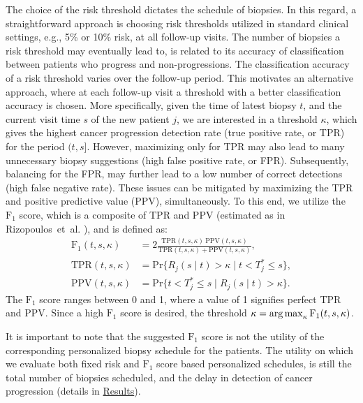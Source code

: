 The choice of the risk threshold dictates the schedule of biopsies. In this regard, a straightforward approach is choosing risk thresholds utilized in standard clinical settings, e.g., 5\% or 10\% risk, at all follow-up visits. The number of biopsies a risk threshold may eventually lead to, is related to its accuracy of classification between patients who progress and non-progressions. The classification accuracy of a risk threshold varies over the follow-up period. This motivates an alternative approach, where at each follow-up visit a threshold with a better classification accuracy is chosen. More specifically, given the time of latest biopsy $t$, and the current visit time $s$ of the new patient $j$, we are interested in a threshold $\kappa$, which gives the highest cancer progression detection rate (true positive rate, or TPR) for the period $(t, s]$. However, maximizing only for TPR may also lead to many unnecessary biopsy suggestions (high false positive rate, or FPR). Subsequently, balancing for the FPR, may further lead to a low number of correct detections (high false negative rate). These issues can be mitigated by maximizing the TPR and positive predictive value (PPV), simultaneously. To this end, we utilize the $\mbox{F}_1$ score, which is a composite of TPR and PPV (estimated as in Rizopoulos~et~al. \cite{landmarking2017}), and is defined as:
\begin{equation}
\label{eq:F1_TPR_PPV}
\begin{split}
\mbox{F}_1(t,  s, \kappa) &= 2\frac{\mbox{TPR}(t,  s, \kappa)\ \mbox{PPV}(t,  s, \kappa)}{\mbox{TPR}(t,  s, \kappa) + \mbox{PPV}(t,  s, \kappa)},\\
\mbox{TPR}(t,  s, \kappa) &= \mbox{Pr}\big\{R_j(s \mid t) > \kappa \mid t < T^*_j \leq s\big\},\\
\mbox{PPV}(t,  s, \kappa) &= \mbox{Pr}\big\{t < T^*_j \leq s \mid R_j(s \mid t) > \kappa \big\}.
\end{split}
\end{equation}
The $\mbox{F}_1$ score ranges between 0 and 1, where a value of 1 signifies perfect TPR and PPV. Since a high $\mbox{F}_1$ score is desired, the threshold ${\kappa=\operatorname{arg\,max}_{\kappa} \mbox{F}_1(t, s, \kappa)}$. 

It is important to note that the suggested $\mbox{F}_1$ score is not the utility of the corresponding personalized biopsy schedule for the patients. The utility on which we evaluate both fixed risk and $\mbox{F}_1$ score based personalized schedules, is still the total number of biopsies scheduled, and the delay in detection of cancer progression (details in \hyperref[sec:results]{Results}). 
